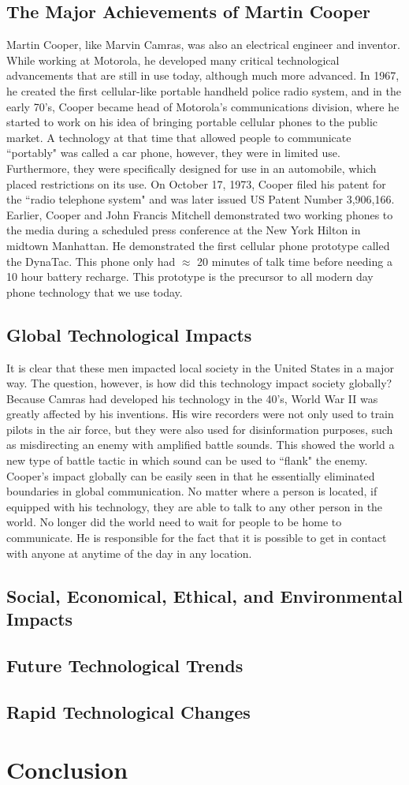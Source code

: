 \documentclass[12pt,letter]{article}
\begin{document}
\subsection{The Major Achievements of Martin Cooper}
Martin Cooper, like Marvin Camras, was also an electrical engineer and inventor. While working at Motorola, he developed many critical technological advancements that are still in use today, although much more advanced. In 1967, he created the first cellular-like portable handheld police radio system\cite{coop}, and in the early 70's, Cooper became head of Motorola's communications division, where he started to work on his idea of bringing portable cellular phones to the public market. A technology at that time that allowed people to communicate ``portably" was called a car phone, however, they were in limited use. Furthermore, they were specifically designed for use in an automobile, which placed restrictions on its use. On October 17, 1973, Cooper filed his patent for the ``radio telephone system" and was later issued US Patent Number 3,906,166\cite{radio}. Earlier, Cooper and John Francis Mitchell demonstrated two working phones to the media during a scheduled press conference at the New York Hilton in midtown Manhattan. He demonstrated the first cellular phone prototype called the DynaTac\cite{wiki:coop}. This phone only had $\approx$ 20 minutes of talk time before needing a 10 hour battery recharge. This prototype is the precursor to all modern day phone technology that we use today.
\subsection{Global Technological Impacts}
It is clear that these men impacted local society in the United States in a major way. The question, however, is how did this technology impact society globally? Because Camras had developed his technology in the 40's, World War II was greatly affected by his inventions. His wire recorders were not only used to train pilots in the air force, but they were also used for disinformation purposes, such as misdirecting an enemy with amplified battle sounds. This showed the world a new type of battle tactic in which sound can be used to ``flank" the enemy. Cooper's impact globally can be easily seen in that he essentially eliminated boundaries in global communication. No matter where a person is located, if equipped with his technology, they are able to talk to any other person in the world. No longer did the world need to wait for people to be home to communicate. He is responsible for the fact that it is possible to get in contact with anyone at anytime of the day in any location.
\subsection{Social, Economical, Ethical, and Environmental Impacts}
\subsection{Future Technological Trends}
\subsection{Rapid Technological Changes}
\section{Conclusion}



\end{document}
